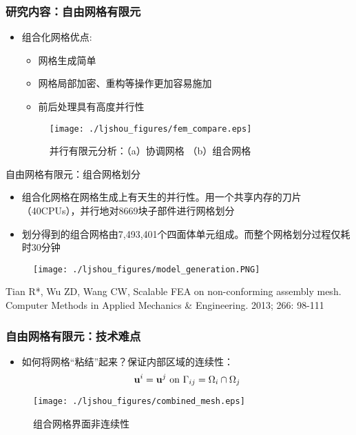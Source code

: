 \documentclass[mathserif]{beamer}
\begin{document}
\begin{CJK}{UTF8}{gkai}
		\begin{frame}
		\frametitle{研究内容：自由网格有限元}
			\begin{itemize}
				\item 组合化网格优点: 
					\begin{itemize}
						\item 网格生成简单
						\item 网格局部加密、重构等操作更加容易施加
						\item 前后处理具有高度并行性
					\end{itemize}
					\begin{figure}
    					\centering
    					\texttt{[image: ./ljshou\_figures/fem\_compare.eps]}
    					\caption{并行有限元分析：（a）协调网格 （b）组合网格}
			        \end{figure}
			\end{itemize}
		\end{frame}	
		
		\begin{frame}{自由网格有限元：组合网格划分}
    		\begin{itemize}
    			\item 组合化网格在网格生成上有天生的并行性。用一个共享内存的刀片（40CPUs），并行地对8669块子部件进行网格划分
    		    \item 划分得到的组合网格由7,493,401个四面体单元组成。而整个网格划分过程仅耗时30分钟
    		\end{itemize}
    		\begin{figure}
    		\centering
    		\texttt{[image: ./ljshou\_figures/model\_generation.PNG]}
    		\end{figure}
    		\tiny Tian R*, Wu ZD, Wang CW, Scalable FEA on non-conforming assembly mesh. Computer Methods in Applied Mechanics \& Engineering. 2013; 266: 98-111
		\end{frame}
	
		\begin{frame}
			\frametitle{自由网格有限元：技术难点}
					\begin{itemize}
						\item 如何将网格“粘结”起来？保证内部区域的连续性：
						\begin{equation*}
							{\bf u}^i = {\bf u}^j \text{ on } \Gamma_{ij} = \Omega_i \cap \Omega_j
						\end{equation*}
					\end{itemize}
					\begin{figure}
						\centering
						\texttt{[image: ./ljshou\_figures/combined\_mesh.eps]}
						\caption{组合网格界面非连续性}
					\end{figure}
		\end{frame}
				


\end{CJK}
\end{document}
